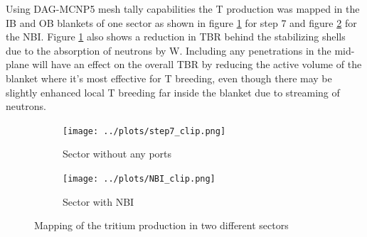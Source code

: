 \documentclass[12pt, letterpaper]{elsarticle}
\begin{document}
Using DAG-MCNP5 mesh tally capabilities the T production was mapped in the IB and OB blankets of one sector as shown in figure \ref{fig:step7} for step 7 and figure \ref{fig:NBI} for the NBI. Figure \ref{fig:step7} also shows a reduction in TBR behind the stabilizing shells due to the absorption of neutrons by W. Including any penetrations in the mid-plane will have an effect on the overall TBR by reducing the active volume of the blanket where it's most effective for T breeding, even though there may be slightly enhanced local T breeding far inside the blanket due to streaming of neutrons.
\begin{figure}[h!]
\centering
\begin{subfigure}{0.49\textwidth}
  \centering
  \texttt{[image: ../plots/step7\_clip.png]}
  \caption{Sector without any ports}
  \label{fig:step7}
\end{subfigure}
\begin{subfigure}{0.49\textwidth}
  \centering
  \texttt{[image: ../plots/NBI\_clip.png]}
  \caption{Sector with NBI}
  \label{fig:NBI}
\end{subfigure}
\caption{Mapping of the tritium production in two different sectors}
\label{fig:TBR mapping}
\end{figure}
\end{document}
